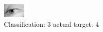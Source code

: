 \begin{figure}[h!]
\begin{center}
\includegraphics[width=0.60\columnwidth]{figures/ID3010_class_3_target_4.png}
\end{center}
\caption{ Classification: 3 actual target: 4}
\label{fig:ID3010_class_3_target_4}
\end{figure}
